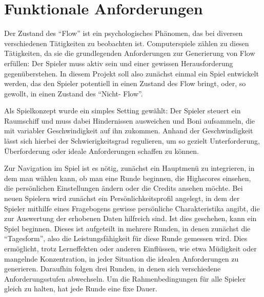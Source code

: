 \documentclass[a4paper,12pt]{scrartcl}
\begin{document}


% 
% 
% 
% 



\tableofcontents
\clearpage



\clearpage


\section{Funktionale Anforderungen}
Der Zustand des "`Flow"' ist ein psychologisches Phänomen, das bei diversen verschiedenen
Tätigkeiten zu beobachten ist. Computerspiele zählen zu diesen Tätigkeiten, da sie die
grundlegenden Anforderungen zur Generierung von Flow erfüllen: Der Spieler muss aktiv
sein und einer gewissen Herausforderung gegenüberstehen.\newline
In diesem Projekt soll also zunächst einmal ein Spiel entwickelt werden, das den Spieler
potentiell in einen Zustand des Flow bringt, oder, so gewollt, in einen Zustand des "`Nicht-
Flow"'.

Als Spielkonzept wurde ein simples Setting gewählt: Der Spieler steuert ein Raumschiff
und muss dabei Hindernissen ausweichen und Boni aufsammeln, die mit variabler
Geschwindigkeit auf ihn zukommen. Anhand der Geschwindigkeit lässt sich hierbei der
Schwierigkeitsgrad regulieren, um so gezielt Unterforderung, Überforderung oder ideale
Anforderungen schaffen zu können.

Zur Navigation im Spiel ist es nötig, zunächst ein Hauptmenü zu integrieren, in dem man
wählen kann, ob man eine Runde beginnen, die Highscores einsehen, die
persönlichen Einstellungen ändern oder die Credits ansehen möchte.\newline
Bei neuen Spielern wird zunächst ein Persönlichkeitsprofil angelegt, in dem der Spieler
mithilfe eines Fragebogens gewisse persönliche Charakteristika angibt, die zur Auswertung
der erhobenen Daten hilfreich sind.\newline
Ist dies geschehen, kann ein Spiel beginnen. Dieses ist aufgeteilt in mehrere Runden, in
denen zunächst die "`Tagesform"', also die Leistungsfähigkeit für diese Runde gemessen
wird. Dies ermöglicht, trotz Lerneffekten oder anderen Einflüssen, wie etwa Müdigkeit oder
mangelnde Konzentration, in jeder Situation die idealen Anforderungen zu
generieren.\newline
Daraufhin folgen drei Runden, in denen sich verschiedene
Anforderungsstufen abwechseln. Um die Rahmenbedingungen für alle Spieler gleich zu halten, hat jede Runde eine fixe
Dauer.
\end{document}
